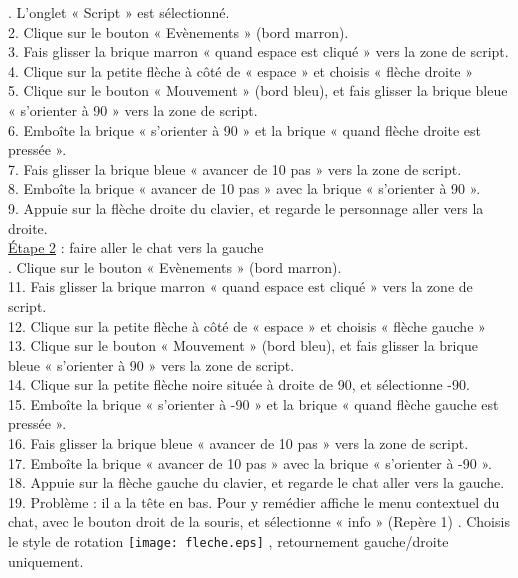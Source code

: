 \documentclass[a4paper,11pt]{article}
\begin{document}
. L'onglet « Script » est sélectionné.\\
2. Clique sur le bouton « Evènements » (bord marron).\\
3. Fais glisser la brique marron « quand espace est cliqué » vers la zone de script.\\
4. Clique sur la petite flèche à côté de « espace » et choisis « flèche droite »\\
5. Clique sur le bouton « Mouvement » (bord bleu), et fais glisser la brique bleue « s'orienter à 90 » vers la zone de script.\\
6. Emboîte la brique « s'orienter à 90 » et la brique « quand flèche droite est pressée ».\\
7. Fais glisser la brique bleue « avancer de 10 pas » vers la zone de script.\\
8. Emboîte la brique « avancer de 10 pas » avec la brique « s'orienter à 90 ».\\
9. Appuie sur la flèche droite du clavier, et regarde le personnage aller vers la droite.\\

\underline{Étape 2} : faire aller le chat vers la gauche\\

. Clique sur le bouton « Evènements » (bord marron).\\
11. Fais glisser la brique marron « quand espace est cliqué » vers la zone de script.\\
12. Clique sur la petite flèche à côté de « espace » et choisis « flèche gauche »\\
13. Clique sur le bouton « Mouvement » (bord bleu), et fais glisser la brique bleue « s'orienter à 90 » vers la zone de script.\\
14. Clique sur la petite flèche noire située à droite de 90, et sélectionne -90.\\
15. Emboîte la brique « s'orienter à -90 » et la brique « quand flèche gauche est pressée ».\\
16. Fais glisser la brique bleue « avancer de 10 pas » vers la zone de script.\\
17. Emboîte la brique « avancer de 10 pas » avec la brique « s'orienter à -90 ».\\
18. Appuie sur la flèche gauche du clavier, et regarde le chat aller vers la gauche.\\
19. Problème : il a la tête en bas. Pour y remédier affiche le menu contextuel du chat, avec le bouton droit de
la souris, et sélectionne « info » (Repère 1) . Choisis le style de rotation \texttt{[image: fleche.eps]} ,  retournement gauche/droite uniquement.\\
\end{document}
